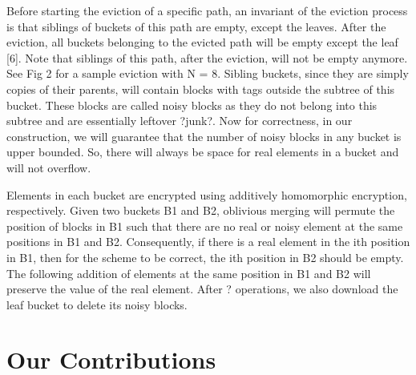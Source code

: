 \documentclass[12pt, oneside]{amsart}   	%
\begin{document}
Before starting the eviction of a specific path, an invariant of the eviction process is that siblings of buckets of this path are empty, except the leaves. After the eviction, all buckets belonging to the evicted path will be empty except the leaf [6]. Note that siblings of this path, after the eviction, will not be empty anymore. See Fig 2 for a sample eviction with N = 8.
Sibling buckets, since they are simply copies of their parents, will contain blocks with tags outside the subtree of this bucket. These blocks are called noisy blocks as they do not belong into this subtree and are essentially leftover ?junk?. Now for correctness, in our construction, we will guarantee that the number of noisy blocks in any bucket is upper bounded. So, there will always be space for real elements in a bucket and will not overflow.

Elements in each bucket are encrypted using additively homomorphic encryption, respectively. Given two buckets B1 and B2, oblivious merging will permute the position of blocks in B1 such that there are no real or noisy element at the same positions in B1 and B2. Consequently, if there is a real element in the ith position in B1, then for the scheme to be correct, the ith position in B2 should be empty. The following addition of elements at the same position in B1 and B2 will preserve the value of the real element. After ? operations, we also download the leaf bucket to delete its noisy blocks.

\section{Our Contributions}
\end{document}
